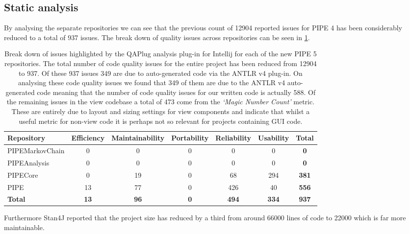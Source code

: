 \subsection{Static analysis}
By analysing the separate repositories we can see that the previous count of \num{12904} reported issues for PIPE 4 has been considerably reduced to a total of \num{937} issues. The break down of quality issues across repositories can be seen in \cref{tbl:pipe5_qaplug}.

\begin{table}[tb]
\small
\begin{center}
  \begin{tabular}{| l | c | c | c | c | c | c |}
    \hline
    Repository & Efficiency & Maintainability & Portability & Reliability & Usability & \textbf{Total} \\ 
    \hline
    PIPEMarkovChain & 0 & 0 & 0 & 0 & 0 & \textbf{0}\\ 
    \hline
    PIPEAnalysis & 0 & 0 & 0 & 0 & 0 & \textbf{0}\\    
    \hline
    PIPECore & 0 & 19 & 0 & 68 & 294 & \textbf{381}\\
    \hline
    PIPE & 13 & 77 & 0 & 426 & 40 & \textbf{556}\\
    \hline
    \textbf{Total} & \textbf{13} & \textbf{96} & \textbf{0} & \textbf{494} & \textbf{334} & {\color{red}\textbf{937}}\\
    \hline

  \end{tabular}
\caption{Break down of issues highlighted by the QAPlug analysis plug-in for Intellij for
each of the new PIPE 5 repositories. The total number of code quality issues for the entire project has been reduced from \num{12904} to \num{937}. Of these \num{937} issues \num{349} are due to auto-generated code via the ANTLR v4 plug-in.
On analysing these code quality issues we found that \num{349} of them are due to the ANTLR v4 auto-generated code meaning that the number of code quality issues for our written code is actually \num{588}. 
Of the remaining issues in the view codebase a total of \num{473} come from the \textit{`Magic Number Count'} metric. These are entirely due to layout and sizing settings for view components and indicate that whilst a useful metric for non-view code it is perhaps not so relevant for projects containing GUI code.
}
\label{tbl:pipe5_qaplug}
\end{center}
\end{table}

Furthermore Stan4J reported that the project size has reduced by a third from around \num{66000} lines of code to \num{22000} which is far more maintainable.


